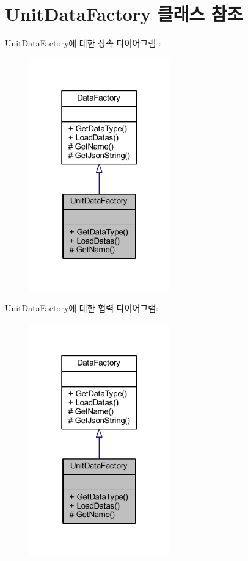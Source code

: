 \hypertarget{class_unit_data_factory}{}\section{Unit\+Data\+Factory 클래스 참조}
\label{class_unit_data_factory}


Unit\+Data\+Factory에 대한 상속 다이어그램 \+: \nopagebreak
\begin{figure}[H]
\begin{center}
\leavevmode
\includegraphics[width=172pt]{class_unit_data_factory__inherit__graph}
\end{center}
\end{figure}


Unit\+Data\+Factory에 대한 협력 다이어그램\+:\nopagebreak
\begin{figure}[H]
\begin{center}
\leavevmode
\includegraphics[width=172pt]{class_unit_data_factory__coll__graph}
\end{center}
\end{figure}

